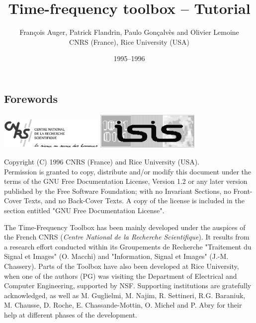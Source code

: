 \documentclass[12pt,a4paper]{book}%
\title{Time-frequency toolbox -- Tutorial}
\author{Fran\c{c}ois Auger, Patrick Flandrin, Paulo Gon\c{c}alv\`es and Olivier Lemoine\\[5mm] CNRS (France), Rice University (USA)}
\date{1995--1996}
\begin{document}
\begin{htmlonly}
\maketitle
\end{htmlonly}

\begin{latexonly}
\pagestyle{empty}

\end{latexonly}

\cleardoublepage

\begin{htmlonly}
\chapter*{Forewords}
\end{htmlonly}

\centerline{\includegraphics[width=5cm]{figure/cnrs}\hspace{2cm}
            \includegraphics[width=5cm]{figure/isis}}

\vspace{2 cm}
Copyright (C)  1996 CNRS (France) and Rice University (USA).\\
Permission is granted to copy, distribute and/or modify this document
under the terms of the GNU Free Documentation License, Version 1.2
or any later version published by the Free Software Foundation;
with no Invariant Sections, no Front-Cover Texts, and no Back-Cover
Texts.  A copy of the license is included in the section entitled "GNU
Free Documentation License".

\vspace{2 cm}
The Time-Frequency Toolbox has been mainly developed under the auspices of
the French CNRS ({\em Centre National de la Recherche Scientifique}). It
results from a research effort conducted within its Groupements de
Recherche "Traitement du Signal et Images" (O. Macchi) and "Information,
Signal et Images" (J.-M. Chassery). Parts of the Toolbox have also been
developed at Rice University, when one of the authors (PG) was visiting the
Department of Electrical and Computer Engineering, supported by NSF.
Supporting institutions are gratefully acknowledged, as well as M.
Guglielmi, M. Najim, R. Settineri, R.G. Baraniuk, M. Chausse, D. Roche,
E. Chassande-Mottin, O. Michel and P. Abry for their help at different 
phases of the development.
\end{document}
